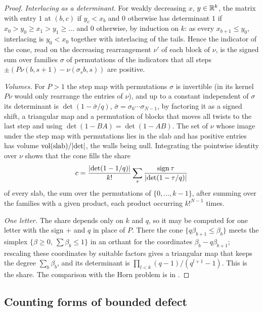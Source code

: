 \begin{proof}
\emph{Interlacing as a determinant.} For weakly decreasing $x$, $y\in\mathbb{R}^k$, the matrix with entry $1$ at $(b,c)$ if $y_c<x_b$ and $0$ otherwise has determinant $1$ if $x_0>y_0\ge x_1>y_1\ge\dots$ and $0$ otherwise, by induction on $k$: as every $x_{b+1}\le y_0$, interlacing is $y_0<x_0$ together with interlacing of the tails. Hence the indicator of the cone, read on the decreasing rearrangement $\nu'$ of each block of $\nu$, is the
signed sum over families $\sigma$ of permutations of the indicators that all steps $\pm(P\nu(b,s+1)-\nu(\sigma_sb,s))$ are positive.

\emph{Volumes.} For $P>1$ the step map with permutations $\sigma$ is invertible (in its kernel $P\nu$ would only rearrange the entries of $\nu$), and up to a constant independent of $\sigma$ its determinant is $\det(1-\bar\sigma/q)$, $\bar\sigma=\sigma_0\cdots\sigma_{N-1}$, by factoring it as a signed shift, a triangular map and a permutation of blocks that moves all twists to the last step and using $\det(1-BA)=\det(1-AB)$. The set of $\nu$ whose
image under the step map with permutations lies in the slab and has positive entries has volume $\operatorname{vol}(\text{slab})/\lvert \det\rvert$, the walls being null. Integrating the pointwise identity over $\nu$ shows that the cone fills the share
\[
  c=\frac{\lvert \det(1-1/q)\rvert}{k!}\sum_\tau\frac{\mathrm{sign}\,\tau}{\lvert \det(1-\tau/q)\rvert}
\]
of every slab, the sum over the permutations of $\{0,\dots,k-1\}$, after summing over the families with a given product, each product occurring $k!^{N-1}$ times.

\emph{One letter.} The share depends only on $k$ and $q$, so it may be computed for one letter with the sign $+$ and $q$ in place of $P$. There the cone $\{q\beta_{b+1}\le\beta_b\}$ meets the simplex $\{\beta\ge0,\ \sum\beta_b\le1\}$ in an orthant for the coordinates $\beta_b-q\beta_{b+1}$; rescaling these coordinates by suitable factors gives a triangular map that keeps the degree $\sum_b\beta_b$, and its determinant is
$\prod_{l<k}(q-1)/(q^{l+1}-1)$. This is the share. The comparison with the Horn problem is in \cite{Forrester2021}.
\end{proof}

\subsection{Counting forms of bounded defect}\label{ss:defect-count}

